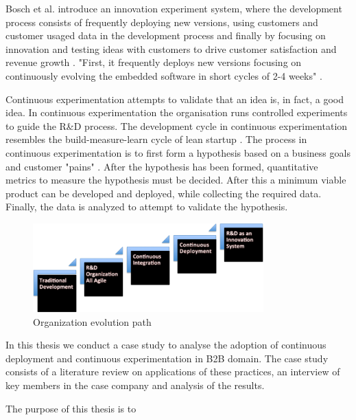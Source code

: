 \documentclass[english]{tktltiki2}
\theoremstyle{definition}
\theoremstyle{remark}
\begin{document}
Bosch et al. introduce an innovation experiment system, where the development process consists of frequently deploying new versions, using customers and customer usaged data in the development process and finally by focusing on innovation and testing ideas with customers to drive customer satisfaction and revenue growth \cite{bosch2012building}. "First, it frequently deploys new versions focusing on continuously evolving the embedded software in short cycles of 2-4 weeks" \cite{eklund2012architecture}.

Continuous experimentation attempts to validate that an idea is, in fact, a good idea. In continuous experimentation the organisation runs controlled experiments to guide the R\&D process. The development cycle in continuous experimentation resembles the build-measure-learn cycle of lean startup \cite{ries2011lean}. The process in continuous experimentation is to first form a hypothesis based on a business goals and customer "pains" \cite{bosch2012building}. After the hypothesis has been formed, quantitative metrics to measure the hypothesis must be decided. After this a minimum viable product can be developed and deployed, while collecting the required data. Finally, the data is analyzed to attempt to validate the hypothesis.


\begin{figure}[H]
	\centering
	\includegraphics[width=3.5in]{stairway.png}
	\caption{Organization evolution path \cite{http://www.janbosch.com/Jan_Bosch/Software_Engineering.html}}
	\label{fig1}
\end{figure}

In this thesis we conduct a case study to analyse the adoption of continuous deployment and continuous experimentation in B2B domain. The case study consists of a literature review on applications of these practices, an interview of key members in the case company and analysis of the results. 

The purpose of this thesis is to
\end{document}
